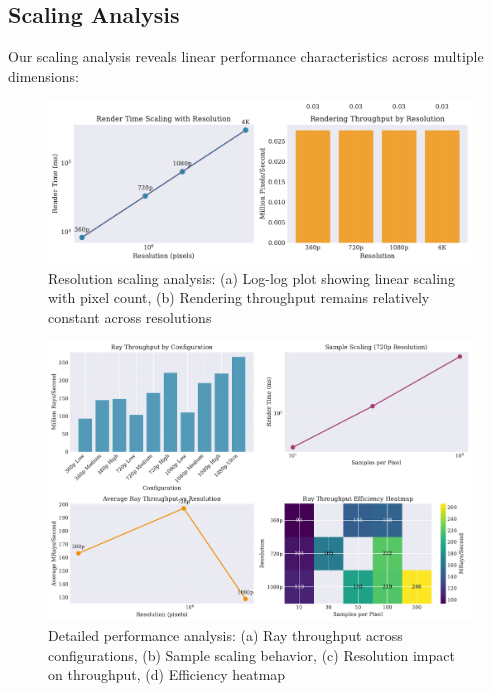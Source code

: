 \documentclass[conference]{IEEEtran}
\begin{document}
\subsection{Scaling Analysis}

Our scaling analysis reveals linear performance characteristics across multiple dimensions:

\begin{figure}[ht]
\centering
\includegraphics[width=\columnwidth]{figures/resolution_scaling.pdf}
\caption{Resolution scaling analysis: (a) Log-log plot showing linear scaling with pixel count, (b) Rendering throughput remains relatively constant across resolutions}
\label{fig:resolution_scaling}
\end{figure}

\begin{figure}[ht]
\centering
\includegraphics[width=\columnwidth]{figures/benchmark_analysis.pdf}
\caption{Detailed performance analysis: (a) Ray throughput across configurations, (b) Sample scaling behavior, (c) Resolution impact on throughput, (d) Efficiency heatmap}
\label{fig:benchmark_analysis}
\end{figure}
\end{document}
